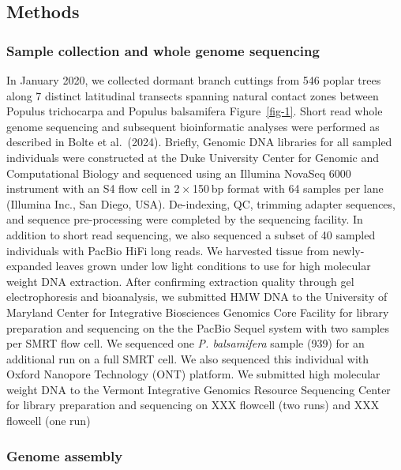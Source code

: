 \documentclass[
]{agujournal2019}
\begin{document}
\subsection{Methods}\label{methods}

\subsubsection{Sample collection and whole genome
sequencing}\label{sample-collection-and-whole-genome-sequencing}

In January 2020, we collected dormant branch cuttings from 546 poplar
trees along 7 distinct latitudinal transects spanning natural contact
zones between Populus trichocarpa and Populus balsamifera
Figure~\ref{fig-1}. Short read whole genome sequencing and subsequent
bioinformatic analyses were performed as described in Bolte et
al.~(2024). Briefly, Genomic DNA libraries for all sampled individuals
were constructed at the Duke University Center for Genomic and
Computational Biology and sequenced using an Illumina NovaSeq 6000
instrument with an S4 flow cell in 2 × 150 bp format with 64 samples per
lane (Illumina Inc., San Diego, USA). De-indexing, QC, trimming adapter
sequences, and sequence pre-processing were completed by the sequencing
facility. In addition to short read sequencing, we also sequenced a
subset of 40 sampled individuals with PacBio HiFi long reads. We
harvested tissue from newly-expanded leaves grown under low light
conditions to use for high molecular weight DNA extraction. After
confirming extraction quality through gel electrophoresis and
bioanalysis, we submitted HMW DNA to the University of Maryland Center
for Integrative Biosciences Genomics Core Facility for library
preparation and sequencing on the the PacBio Sequel system with two
samples per SMRT flow cell. We sequenced one \emph{P. balsamifera}
sample (939) for an additional run on a full SMRT cell. We also
sequenced this individual with Oxford Nanopore Technology (ONT)
platform. We submitted high molecular weight DNA to the Vermont
Integrative Genomics Resource Sequencing Center for library preparation
and sequencing on XXX flowcell (two runs) and XXX flowcell (one run)

\subsubsection{Genome assembly}\label{genome-assembly}
\end{document}
